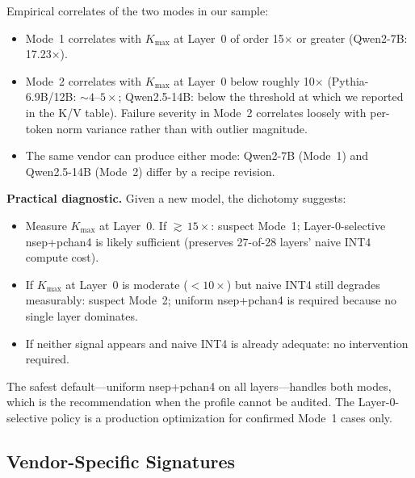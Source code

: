 \documentclass[11pt]{article}
\begin{document}
Empirical correlates of the two modes in our sample:
\begin{itemize}[nosep]
    \item Mode~1 correlates with $K_{\max}$ at Layer~0 of order 15$\times$ or greater (Qwen2-7B: 17.23$\times$).
    \item Mode~2 correlates with $K_{\max}$ at Layer~0 below roughly 10$\times$ (Pythia-6.9B/12B: ${\sim}4$--$5\times$; Qwen2.5-14B: below the threshold at which we reported in the K/V table). Failure severity in Mode~2 correlates loosely with per-token norm variance rather than with outlier magnitude.
    \item The same vendor can produce either mode: Qwen2-7B (Mode~1) and Qwen2.5-14B (Mode~2) differ by a recipe revision.
\end{itemize}

\textbf{Practical diagnostic.} Given a new model, the dichotomy suggests:
\begin{itemize}[nosep]
    \item Measure $K_{\max}$ at Layer~0. If ${\gtrsim}\,15\times$: suspect Mode~1; Layer-0-selective nsep+pchan4 is likely sufficient (preserves 27-of-28 layers' naive INT4 compute cost).
    \item If $K_{\max}$ at Layer~0 is moderate ($<10\times$) but naive INT4 still degrades measurably: suspect Mode~2; uniform nsep+pchan4 is required because no single layer dominates.
    \item If neither signal appears and naive INT4 is already adequate: no intervention required.
\end{itemize}

The safest default---uniform nsep+pchan4 on all layers---handles both modes, which is the recommendation when the profile cannot be audited. The Layer-0-selective policy is a production optimization for confirmed Mode~1 cases only.

\subsection{Vendor-Specific Signatures}
\end{document}
